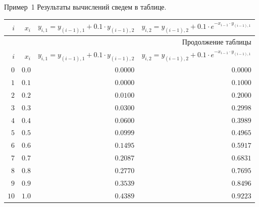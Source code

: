 \documentclass[aspectratio=169, mathserif]{beamer}	%
\begin{document}
\begin{frame}[fragile, ]{Пример~1}
\scriptsize
Результаты вычислений сведем в таблице.
\vfill
\renewcommand{\arraystretch}{1.5}
\begin{longtable}{|r|r|r|r|}

	\hline \multicolumn{1}{|r|}{$i$} & \multicolumn{1}{r|}{$x_i$} & \multicolumn{1}{r|}{$y_{i,1} = y_{(i-1),1} + 0.1 \cdot y_{(i-1),2}$} & \multicolumn{1}{r|}{$y_{i,2} = y_{(i-1),2} + 0.1 \cdot e^{-x_{i-1}\cdot y_{(i-1),1}}$}  \\
	\hline
	\endfirsthead

	\multicolumn{4}{r}{Продолжение таблицы \thetable{}} \\
	\hline
	\multicolumn{1}{|r|}{$i$} & \multicolumn{1}{r|}{$x_i$} & \multicolumn{1}{r|}{$y_{i,1} = y_{(i-1),1} + 0.1 \cdot y_{(i-1),2}$} & \multicolumn{1}{r|}{$y_{i,2} = y_{(i-1),2} + 0.1 \cdot e^{-x_{i-1}\cdot y_{(i-1),1}}$}  \\
	\hline
	\endhead

	$0$  &$0.0$ & $0.0000$ & $0.0000$  \\
	\hline

	$1$  &$0.1$ & $0.0000$ & $0.1000$  \\
	\hline

	$2$  &$0.2$ & $0.0100$ & $0.2000$  \\
	\hline

	$3$  &$0.3$ & $0.0300$ & $0.2998$ \\
	\hline

	$4$  &$0.4$ & $0.0600$ & $0.3989$  \\
	\hline

	$5$  &$0.5$ & $0.0999$ & $0.4965$  \\
	\hline

	$6$  &$0.6$ & $0.1495$ & $0.5917$  \\
	\hline

	$7$  &$0.7$ & $0.2087$ & $0.6831$  \\
	\hline

	$8$  &$0.8$ & $0.2770$ & $0.7695$  \\
	\hline

	$9$  &$0.9$ & $0.3539$ & $0.8496$  \\
	\hline

	$10$  &$1.0$ & $0.4389$ & $0.9223$  \\
	\hline
\end{longtable}
\vfill
\end{frame}
\end{document}
